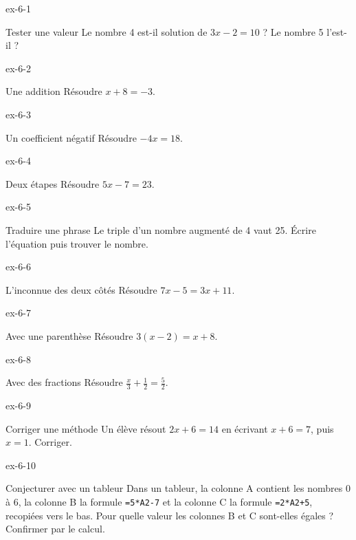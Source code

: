 \clearpage{}
\begin{blocLivre}{ex-6-1}\begin{exercice}[1]{Tester une valeur}
Le nombre 4 est-il solution de $3x-2=10$ ? Le nombre 5 l’est-il ?
\end{exercice}\end{blocLivre}
\begin{blocLivre}{ex-6-2}\begin{exercice}[1]{Une addition}
Résoudre $x+8=-3$.
\end{exercice}\end{blocLivre}
\begin{blocLivre}{ex-6-3}\begin{exercice}[1]{Un coefficient négatif}
Résoudre $-4x=18$.
\end{exercice}\end{blocLivre}
\begin{blocLivre}{ex-6-4}\begin{exercice}[1]{Deux étapes}
Résoudre $5x-7=23$.
\end{exercice}\end{blocLivre}
\begin{blocLivre}{ex-6-5}\begin{exercice}[1]{Traduire une phrase}
Le triple d’un nombre augmenté de 4 vaut 25. Écrire l’équation puis trouver le nombre.
\end{exercice}\end{blocLivre}

\begin{blocLivre}{ex-6-6}\begin{exercice}[2]{L’inconnue des deux côtés}
Résoudre $7x-5=3x+11$.
\end{exercice}\end{blocLivre}
\begin{blocLivre}{ex-6-7}\begin{exercice}[2]{Avec une parenthèse}
Résoudre $3(x-2)=x+8$.
\end{exercice}\end{blocLivre}
\begin{blocLivre}{ex-6-8}\begin{exercice}[2]{Avec des fractions}
Résoudre $\frac{x}{3}+\frac12=\frac52$.
\end{exercice}\end{blocLivre}
\begin{blocLivre}{ex-6-9}\begin{exercice}[2]{Corriger une méthode}
Un élève résout $2x+6=14$ en écrivant $x+6=7$, puis $x=1$. Corriger.
\end{exercice}\end{blocLivre}
\begin{blocLivre}{ex-6-10}\begin{exercice}[2]{Conjecturer avec un tableur}
Dans un tableur, la colonne A contient les nombres 0 à 6, la colonne B la formule \texttt{=5*A2-7} et la colonne C la formule \texttt{=2*A2+5}, recopiées vers le bas. Pour quelle valeur les colonnes B et C sont-elles égales ? Confirmer par le calcul.
\label{fig-ex-6-10}
\end{exercice}\end{blocLivre}

